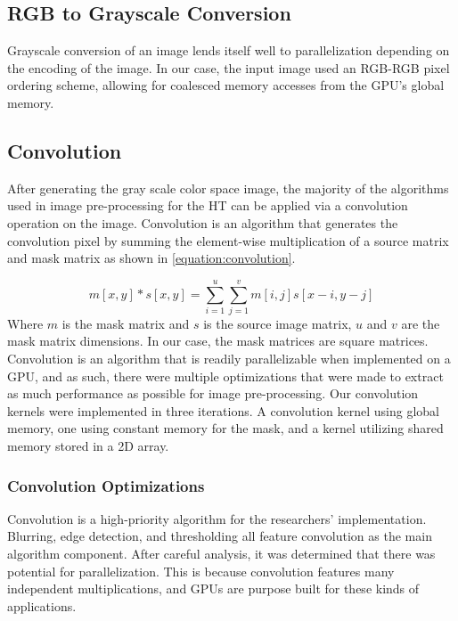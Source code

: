 \documentclass[conference]{IEEEtran}
\begin{document}
\subsection{RGB to Grayscale Conversion}
Grayscale conversion of an image lends itself well to parallelization depending on the encoding of the image.
In our case, the input image used an RGB-RGB pixel ordering scheme, allowing for coalesced memory accesses from the GPU's global memory.



\subsection{Convolution}
After generating the gray scale color space image, the majority of the algorithms used in image pre-processing for the HT can be applied via a convolution operation on the image.
Convolution is an algorithm that generates the convolution pixel by summing the element-wise multiplication of a source matrix and mask matrix as shown in \autoref{equation:convolution}.

\begin{equation}
  m[x,y] * s[x,y] = \sum\limits_{i = 1}^{u} \sum\limits_{j = 1}^{v} m[i,j]s[x-i, y-j]
  \label{equation:convolution}
\end{equation}
Where $m$ is the mask matrix and $s$ is the source image matrix, $u$ and $v$ are the mask matrix dimensions. In our case, the mask matrices are square matrices.
Convolution is an algorithm that is readily parallelizable when implemented on a GPU, and as such, there were multiple optimizations that were made to extract as much performance as possible for image pre-processing.
Our convolution kernels were implemented in three iterations. 
A convolution kernel using global memory, one using constant memory for the mask, and a kernel utilizing shared memory stored in a 2D array.


\subsubsection*{Convolution Optimizations}
Convolution is a high-priority algorithm for the researchers' implementation. Blurring, edge detection, and thresholding all feature convolution as the main algorithm component. After careful analysis, it was determined that there was potential  for parallelization. This is because convolution features many independent multiplications, and GPUs are purpose built for these kinds of applications.
\end{document}
